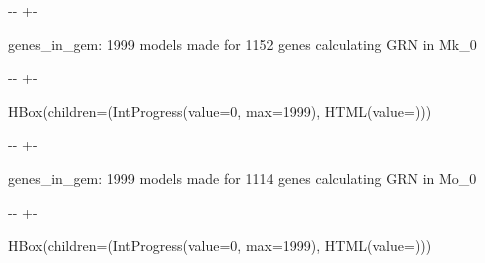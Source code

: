 \documentclass[letterpaper,10pt,english]{sphinxmanual}
\newlength\nbsphinxcodecellspacing
\begin{document}
%
{
\kern-\sphinxverbatimsmallskipamount\kern-\baselineskip
\kern+\FrameHeightAdjust\kern-\fboxrule
\vspace{\nbsphinxcodecellspacing}
%
\begin{sphinxVerbatim}[commandchars=\\\{\}]

genes\_in\_gem: 1999
models made for 1152 genes
calculating GRN in Mk\_0
\end{sphinxVerbatim}
}
\relax

{

\kern-\sphinxverbatimsmallskipamount\kern-\baselineskip
\kern+\FrameHeightAdjust\kern-\fboxrule
\vspace{\nbsphinxcodecellspacing}

%
\begin{sphinxVerbatim}[commandchars=\\\{\}]
HBox(children=(IntProgress(value=0, max=1999), HTML(value=\PYGZsq{}\PYGZsq{})))
\end{sphinxVerbatim}
}



%
{
\kern-\sphinxverbatimsmallskipamount\kern-\baselineskip
\kern+\FrameHeightAdjust\kern-\fboxrule
\vspace{\nbsphinxcodecellspacing}
%
\begin{sphinxVerbatim}[commandchars=\\\{\}]

genes\_in\_gem: 1999
models made for 1114 genes
calculating GRN in Mo\_0
\end{sphinxVerbatim}
}
\relax

{

\kern-\sphinxverbatimsmallskipamount\kern-\baselineskip
\kern+\FrameHeightAdjust\kern-\fboxrule
\vspace{\nbsphinxcodecellspacing}

%
\begin{sphinxVerbatim}[commandchars=\\\{\}]
HBox(children=(IntProgress(value=0, max=1999), HTML(value=\PYGZsq{}\PYGZsq{})))
\end{sphinxVerbatim}
}
\end{document}

